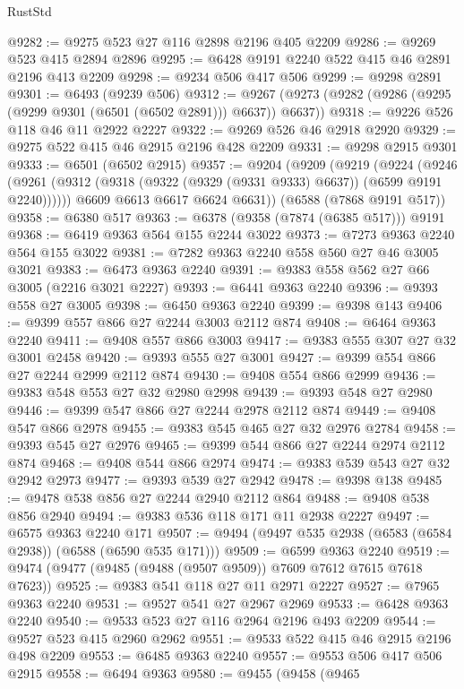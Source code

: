 \begin{lexlean}{RustStd}
\begin{coremodule}
@9282 := @9275 @523 @27 @116 @2898 @2196 @405 @2209
@9286 := @9269 @523 @415 @2894 @2896
@9295 := @6428 @9191 @2240 @522 @415 @46 @2891 @2196 @413 @2209
@9298 := @9234 @506 @417 @506
@9299 := @9298 @2891
@9301 := @6493 (@9239 @506)
@9312 := @9267 (@9273 (@9282 (@9286 (@9295 (@9299 @9301 (@6501 (@6502 @2891))) @6637)) @6637))
@9318 := @9226 @526 @118 @46 @11 @2922 @2227
@9322 := @9269 @526 @46 @2918 @2920
@9329 := @9275 @522 @415 @46 @2915 @2196 @428 @2209
@9331 := @9298 @2915 @9301
@9333 := @6501 (@6502 @2915)
@9357 := @9204
    (@9209
      (@9219
        (@9224
          (@9246 (@9261 (@9312 (@9318 (@9322 (@9329 (@9331 @9333) @6637)) (@6599 @9191 @2240))))))
        @6609
        @6613
        @6617
        @6624
        @6631))
    (@6588 (@7868 @9191 @517))
@9358 := @6380 @517
@9363 := @6378 (@9358 (@7874 (@6385 @517))) @9191
@9368 := @6419 @9363 @564 @155 @2244 @3022
@9373 := @7273 @9363 @2240 @564 @155 @3022
@9381 := @7282 @9363 @2240 @558 @560 @27 @46 @3005 @3021
@9383 := @6473 @9363 @2240
@9391 := @9383 @558 @562 @27 @66 @3005 (@2216 @3021 @2227)
@9393 := @6441 @9363 @2240
@9396 := @9393 @558 @27 @3005
@9398 := @6450 @9363 @2240
@9399 := @9398 @143
@9406 := @9399 @557 @866 @27 @2244 @3003 @2112 @874
@9408 := @6464 @9363 @2240
@9411 := @9408 @557 @866 @3003
@9417 := @9383 @555 @307 @27 @32 @3001 @2458
@9420 := @9393 @555 @27 @3001
@9427 := @9399 @554 @866 @27 @2244 @2999 @2112 @874
@9430 := @9408 @554 @866 @2999
@9436 := @9383 @548 @553 @27 @32 @2980 @2998
@9439 := @9393 @548 @27 @2980
@9446 := @9399 @547 @866 @27 @2244 @2978 @2112 @874
@9449 := @9408 @547 @866 @2978
@9455 := @9383 @545 @465 @27 @32 @2976 @2784
@9458 := @9393 @545 @27 @2976
@9465 := @9399 @544 @866 @27 @2244 @2974 @2112 @874
@9468 := @9408 @544 @866 @2974
@9474 := @9383 @539 @543 @27 @32 @2942 @2973
@9477 := @9393 @539 @27 @2942
@9478 := @9398 @138
@9485 := @9478 @538 @856 @27 @2244 @2940 @2112 @864
@9488 := @9408 @538 @856 @2940
@9494 := @9383 @536 @118 @171 @11 @2938 @2227
@9497 := @6575 @9363 @2240 @171
@9507 := @9494 (@9497 @535 @2938 (@6583 (@6584 @2938)) (@6588 (@6590 @535 @171)))
@9509 := @6599 @9363 @2240
@9519 := @9474 (@9477 (@9485 (@9488 (@9507 @9509)) @7609 @7612 @7615 @7618 @7623))
@9525 := @9383 @541 @118 @27 @11 @2971 @2227
@9527 := @7965 @9363 @2240
@9531 := @9527 @541 @27 @2967 @2969
@9533 := @6428 @9363 @2240
@9540 := @9533 @523 @27 @116 @2964 @2196 @493 @2209
@9544 := @9527 @523 @415 @2960 @2962
@9551 := @9533 @522 @415 @46 @2915 @2196 @498 @2209
@9553 := @6485 @9363 @2240
@9557 := @9553 @506 @417 @506 @2915
@9558 := @6494 @9363
@9580 := @9455
    (@9458
      (@9465

\end{coremodule}
\end{lexlean}

